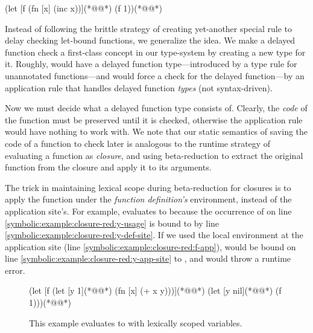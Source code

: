 {
\lstset{numbers=left}
\begin{cljlisting}
(let [f (fn [x] (inc x))](*@\label{symbolic:example:let-bound:def-f}@*)
  (f 1))(*@\label{symbolic:example:let-bound:app-f}@*)
\end{cljlisting}
}

Instead of following the brittle strategy of creating yet-another special rule to delay checking
let-bound functions, we generalize the idea.
We make a delayed function check a first-class concept in our type-system by
creating a new type for it.
Roughly,  would have a delayed function type---introduced by
a type rule for unannotated functions---and 
would force a check for the delayed function---by an application
rule that handles delayed function \emph{types} (not syntax-driven).

Now we must decide what a delayed function type consists of.
Clearly, the \emph{code} of the function must be preserved until
it is checked, otherwise the application rule would have nothing
to work with.
We note that our static semantics of saving
the code of a function to check later
is analogous to the runtime strategy of
evaluating a function as \emph{closure},
and using beta-reduction to extract the original
function from the closure and apply it to its arguments.

The trick in maintaining lexical scope during beta-reduction for closures
is to apply the function under the \emph{function definition's}
environment, instead of the application site's.
For example,
evaluates
to 
because
the occurrence of
 on line \ref{symbolic:example:closure-red:y-usage}
is bound to  by line \ref{symbolic:example:closure-red:y-def-site}.
If we used the local environment at the application site (line \ref{symbolic:example:closure-red:f-app}),
 would be bound on line \ref{symbolic:example:closure-red:y-app-site}
to ,
and would throw a runtime error.

\begin{figure}
{
\lstset{numbers=left}
\begin{cljlisting}
(let [f (let [y 1](*@\label{symbolic:example:closure-red:y-def-site}@*)
          (fn [x] (+ x y)))](*@\label{symbolic:example:closure-red:y-usage}@*)
  (let [y nil](*@\label{symbolic:example:closure-red:y-app-site}@*)
    (f 1)))(*@\label{symbolic:example:closure-red:f-app}@*)
\end{cljlisting}
}
  \caption{This example evaluates to  with lexically scoped variables.}
  \label{symbolic:example:closure-red}
\end{figure}

